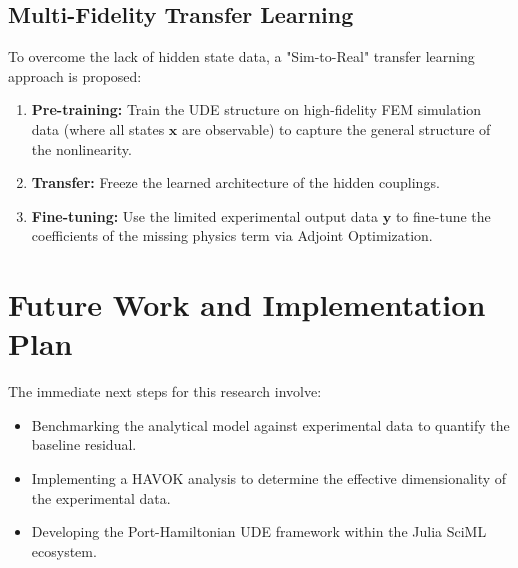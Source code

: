 \documentclass[11pt]{article}
\begin{document}
\subsection{Multi-Fidelity Transfer Learning}
To overcome the lack of hidden state data, a "Sim-to-Real" transfer learning approach is proposed:
\begin{enumerate}
    \item \textbf{Pre-training:} Train the UDE structure on high-fidelity FEM simulation data (where all states $\mathbf{x}$ are observable) to capture the general structure of the nonlinearity.
    \item \textbf{Transfer:} Freeze the learned architecture of the hidden couplings.
    \item \textbf{Fine-tuning:} Use the limited experimental output data $\mathbf{y}$ to fine-tune the coefficients of the missing physics term via Adjoint Optimization.
\end{enumerate}

\section{Future Work and Implementation Plan}
The immediate next steps for this research involve:
\begin{itemize}
    \item Benchmarking the analytical model against experimental data to quantify the baseline residual.
    \item Implementing a HAVOK analysis to determine the effective dimensionality of the experimental data.
    \item Developing the Port-Hamiltonian UDE framework within the Julia SciML ecosystem.
\end{itemize}


\end{document}

